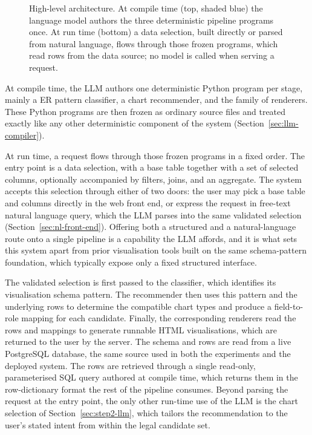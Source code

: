 \begin{figure}[htbp]
{%
}
\caption{High-level architecture. At compile time (top, shaded blue) the language model authors the three deterministic pipeline programs once. At run time (bottom) a data selection, built directly or parsed from natural language, flows through those frozen programs, which read rows from the data source; no model is called when serving a request.}
\label{fig:architecture}
\end{figure}

At compile time, the LLM authors one deterministic Python program per stage, mainly a ER pattern classifier, a chart recommender, and the family of renderers. These Python programs are then frozen as ordinary source files and treated exactly like any other deterministic component of the system (Section~\ref{sec:llm-compiler}).

At run time, a request flows through those frozen programs in a fixed order. The entry point is a data selection, with a base table together with a set of selected columns, optionally accompanied by filters, joins, and an aggregate. The system accepts this selection through either of two doors: the user may pick a base table and columns directly in the web front end, or express the request in free-text natural language query, which the LLM parses into the same validated selection (Section~\ref{sec:nl-front-end}). Offering both a structured and a natural-language route onto a single pipeline is a capability the LLM affords, and it is what sets this system apart from prior visualisation tools built on the same schema-pattern foundation, which typically expose only a fixed structured interface. 

The validated selection is first passed to the classifier, which identifies its visualisation schema pattern. The recommender then uses this pattern and the underlying rows to determine the compatible chart types and produce a field-to-role mapping for each candidate. Finally, the corresponding renderers read the rows and mappings to generate runnable HTML visualisations, which are returned to the user by the server. The schema and rows are read from a live PostgreSQL database, the same source used in both the experiments and the deployed system. The rows are retrieved through a single read-only, parameterised SQL query authored at compile time, which returns them in the row-dictionary format the rest of the pipeline consumes. Beyond parsing the request at the entry point, the only other run-time use of the LLM is the chart selection of Section~\ref{sec:step2-llm}, which tailors the recommendation to the user's stated intent from within the legal candidate set.


